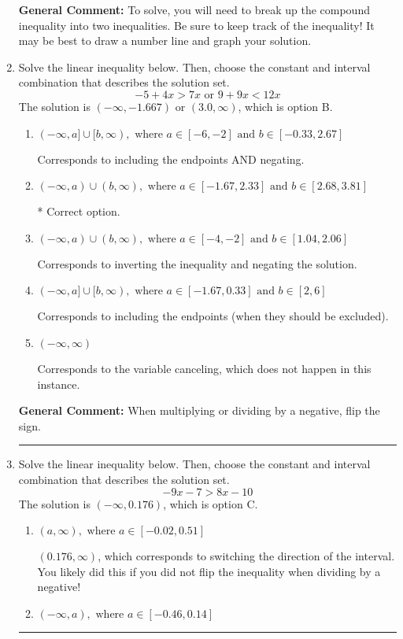 \documentclass{extbook}[14pt]
\newcommand{\litem}[1]{\item #1

\rule{\textwidth}{0.4pt}}
\begin{document}
\begin{enumerate}
{\textbf{General Comment:} To solve, you will need to break up the compound inequality into two inequalities. Be sure to keep track of the inequality! It may be best to draw a number line and graph your solution.
}
\litem{
Solve the linear inequality below. Then, choose the constant and interval combination that describes the solution set.
\[ -5 + 4 x > 7 x \text{ or } 9 + 9 x < 12 x \]The solution is \( (-\infty, -1.667) \text{ or } (3.0, \infty) \), which is option B.\begin{enumerate}[label=\Alph*.]
\item \( (-\infty, a] \cup [b, \infty), \text{ where } a \in [-6, -2] \text{ and } b \in [-0.33, 2.67] \)

Corresponds to including the endpoints AND negating.
\item \( (-\infty, a) \cup (b, \infty), \text{ where } a \in [-1.67, 2.33] \text{ and } b \in [2.68, 3.81] \)

 * Correct option.
\item \( (-\infty, a) \cup (b, \infty), \text{ where } a \in [-4, -2] \text{ and } b \in [1.04, 2.06] \)

Corresponds to inverting the inequality and negating the solution.
\item \( (-\infty, a] \cup [b, \infty), \text{ where } a \in [-1.67, 0.33] \text{ and } b \in [2, 6] \)

Corresponds to including the endpoints (when they should be excluded).
\item \( (-\infty, \infty) \)

Corresponds to the variable canceling, which does not happen in this instance.
\end{enumerate}

\textbf{General Comment:} When multiplying or dividing by a negative, flip the sign.
}
\litem{
Solve the linear inequality below. Then, choose the constant and interval combination that describes the solution set.
\[ -9x -7 > 8x -10 \]The solution is \( (-\infty, 0.176) \), which is option C.\begin{enumerate}[label=\Alph*.]
\item \( (a, \infty), \text{ where } a \in [-0.02, 0.51] \)

 $(0.176, \infty)$, which corresponds to switching the direction of the interval. You likely did this if you did not flip the inequality when dividing by a negative!
\item \( (-\infty, a), \text{ where } a \in [-0.46, 0.14] \)


\end{enumerate}}
\end{enumerate}
\end{document}
